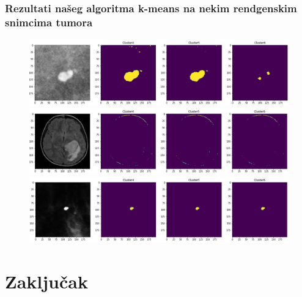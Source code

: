 \documentclass{article}
\begin{document}
\begin{itemize}
\newpage

\subsubsection{\selectfont Rezultati na\v{s}eg algoritma {\selectfont k-means} na nekim rendgenskim snimcima tumora}

\begin{figure}[h]
\centerline{\includegraphics[scale=0.45]{images/segmented_k_means0.png}}
\centerline{\includegraphics[scale=0.45]{images/segmented_k_means1.png}}
\centerline{\includegraphics[scale=0.45]{images/segmented_k_means2.png}}
\end{figure}

\newpage

\end{itemize}

\section{\selectfont Zaklju\v{c}ak}
\end{document}
